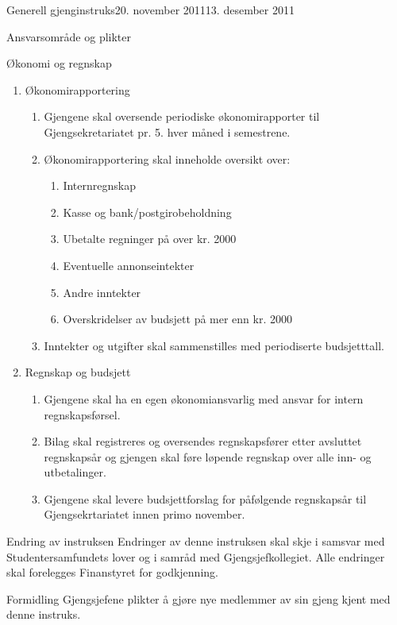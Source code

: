 \documentclass[../fsbok.tex]{subfiles}
\begin{document}
\begin{instruks}{Generell gjenginstruks}{20. november 2011}{13. desember 2011}
\begin{instruksledd}{Ansvarsområde og plikter}
    \end{instruksledd}

	\begin{instruksledd}{Økonomi og regnskap}
		\begin{enumerate}
			\item Økonomirapportering
			\begin{enumerate}  
				\item Gjengene skal oversende periodiske økonomirapporter til
				Gjengsekretariatet pr. 5. hver måned i semestrene.
				\item Økonomirapportering skal inneholde oversikt over:
				\begin {enumerate} 
					\item Internregnskap
					\item Kasse og bank/postgirobeholdning
					\item Ubetalte regninger på over kr. 2000
					\item Eventuelle annonseintekter
					\item Andre inntekter
					\item Overskridelser av budsjett på mer enn kr. 2000
				\end {enumerate}
				\item Inntekter og utgifter skal sammenstilles med periodiserte 
				budsjetttall.
			\end {enumerate}
			\item {Regnskap og budsjett}
			\begin {enumerate}
				\item Gjengene skal ha en egen økonomiansvarlig med ansvar for intern 
				regnskapsførsel.
				\item Bilag skal registreres og oversendes regnskapsfører etter avsluttet 
				regnskapsår og gjengen skal føre løpende regnskap over alle inn- og 
				utbetalinger.
				\item Gjengene skal levere budsjettforslag for påfølgende regnskapsår til 
				Gjengsekrtariatet innen primo november.
			\end {enumerate}
		\end{enumerate}

	\end{instruksledd}

	\begin{instruksledd}{Endring av instruksen}
		Endringer av denne instruksen skal skje i samsvar med Studentersamfundets lover og i samråd 
		med Gjengsjefkollegiet. Alle endringer skal forelegges Finanstyret for godkjenning.

	\end{instruksledd}

	\begin{instruksledd}{Formidling}
		Gjengsjefene plikter å gjøre nye medlemmer av sin gjeng kjent med denne instruks.

	\end{instruksledd}
 	
\end{instruks}
\end{document}
